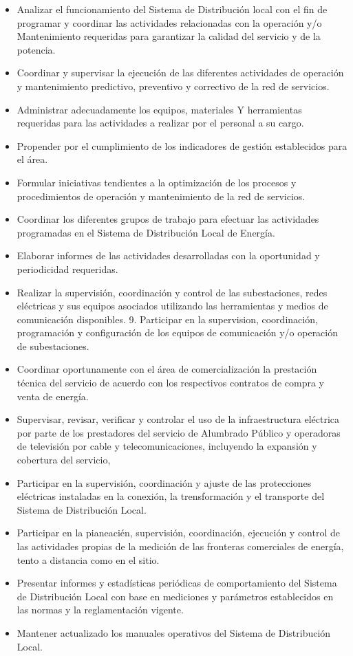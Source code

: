 \documentclass[a5paper]{book}%
\begin{document}
\begin{itemize}
	\item  Analizar el funcionamiento del Sistema de Distribución local con el fin de programar y coordinar  las actividades relacionadas con la operación y/o Mantenimiento requeridas para garantizar la calidad del servicio y de la potencia.
	\item  Coordinar y supervisar la ejecución de las diferentes actividades de operación y mantenimiento predictivo,  preventivo y correctivo de la red de servicios.
	\item  Administrar adecuadamente los equipos, materiales Y herramientas requeridas para las actividades a realizar por el personal a su cargo.
	\item  Propender por el cumplimiento de los indicadores de gestión establecidos para el área.
	\item  Formular iniciativas tendientes a la optimización de los procesos y procedimientos de operación y mantenimiento de la red de servicios.
	\item  Coordinar los diferentes grupos de trabajo para efectuar las actividades programadas en  el Sistema de Distribución Local de Energía.
	\item  Elaborar informes de las actividades desarrolladas con la oportunidad y periodicidad requeridas.
	\item  Realizar la supervisión, coordinación y control de las subestaciones, redes eléctricas y sus equipos asociados utilizando las herramientas y
	medios de comunicación disponibles. 9. Participar en la supervision, coordinación, programación y configuración de los equipos de comunicación y/o operación de subestaciones.
	\item  Coordinar oportunamente con el área de comercialización la prestación técnica del servicio de acuerdo con los respectivos contratos de compra
	y venta de energía.
	\item  Supervisar, revisar, verificar y controlar el uso de la infraestructura eléctrica por parte de los prestadores del servicio de Alumbrado Público y
	operadoras de televisión por cable y telecomunicaciones, incluyendo la expansión y cobertura del servicio,
	\item  Participar en la supervisión, coordinación y ajuste de las protecciones eléctricas instaladas en la conexión, la trensformación y el transporte del
	Sistema de Distribución Local.
	\item  Participar en la pianeacién, supervisión, coordinación, ejecución y control de las actividades propias de la medición de las fronteras comerciales de energía, tento a distancia como en el sitio.
	\item  Presentar informes y estadísticas  periódicas de comportamiento del Sistema de Distribución Local con base en mediciones y parámetros establecidos en las normas y la reglamentación vigente.
	\item  Mantener actualizado los manuales operativos del Sistema de Distribución Local.
\end{itemize}
\end{document}
